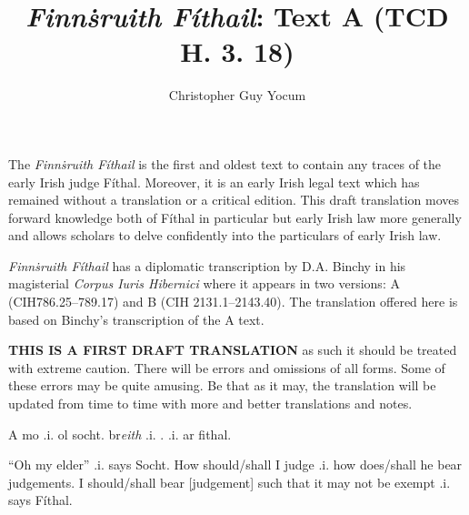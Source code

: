\documentclass[11pt]{article}
\author{Christopher Guy Yocum}
\title{\emph{Finn\.{s}ruith F\'{i}thail}: Text A (TCD H. 3. 18)}
\begin{document}
\maketitle

The \emph{Finn\.{s}ruith F\'{i}thail} is the first and oldest text to contain any traces of the early Irish judge F\'{i}thal.  Moreover, it is an early Irish legal text which has remained without a translation or a critical edition.  This draft translation moves forward knowledge both of F\'{i}thal in particular but early Irish law more generally and allows scholars to delve confidently into the particulars of early Irish law.

\emph{Finn\.{s}ruith F\'{i}thail} has a diplomatic transcription by D.A. Binchy in his magisterial \emph{Corpus Iuris Hibernici} where it appears in two versions: A (CIH786.25--789.17) and B (CIH 2131.1--2143.40).  The translation offered here is based on Binchy's transcription of the A text.

\Large \textbf{THIS IS A FIRST DRAFT TRANSLATION} as such it should be treated with extreme caution.  There will be errors and omissions of all forms.  Some of these errors may be quite amusing.  Be that as it may, the translation will be updated from time to time with more and better translations and notes.

\newpage

\begin{pages}
  \begin{Leftside}
    \beginnumbering\pstart

    A mo  .i. ol socht.   br\emph{eith} .i.   .    .i. ar fithal.

    \pend
    \endnumbering
  \end{Leftside}

  \begin{Rightside}
    \beginnumbering\pstart
    
    \enquote{Oh my elder} .i. says Socht.  How should/shall I judge .i. how does/shall he bear judgements.  I should/shall bear [judgement] such that it may not be exempt .i. says F\'{i}thal.
  
    \pend
    \endnumbering
  \end{Rightside}

  \Pages


\end{pages}
\end{document}
